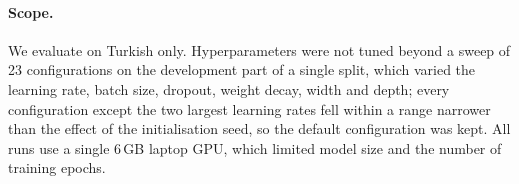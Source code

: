 \paragraph{Scope.}
We evaluate on Turkish only. Hyperparameters were not tuned beyond a sweep of 23 configurations on the development part of a single split, which varied the learning rate, batch size, dropout, weight decay, width and depth; every configuration except the two largest learning rates fell within a range narrower than the effect of the initialisation seed, so the default configuration was kept. All runs use a single 6\,GB laptop GPU, which limited model size and the number of training epochs.
